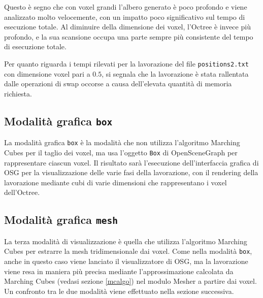 Questo è segno che con voxel grandi l'albero generato è poco profondo e viene analizzato molto velocemente, con un impatto poco significativo sul tempo di esecuzione totale. Al diminuire della dimensione dei voxel, l'Octree è invece più profondo, e la sua scansione occupa una parte sempre più consistente del tempo di esecuzione totale.

Per quanto riguarda i tempi rilevati per la lavorazione del file \texttt{positions2.txt} con dimensione voxel pari a $0.5$, si segnala che la lavorazione è stata rallentata dalle operazioni di swap occorse a causa dell'elevata quantità di memoria richiesta.

\subsection{Modalità grafica \texttt{box}}
La modalità grafica \texttt{box} è la modalità che non utilizza l'algoritmo Marching Cubes per il taglio dei voxel, ma usa l'oggetto \texttt{Box} di OpenSceneGraph per rappresentare ciascun voxel. Il risultato sarà l'esecuzione dell'interfaccia grafica di OSG per la visualizzazione delle varie fasi della lavorazione, con il rendering della lavorazione mediante cubi di varie dimensioni che rappresentano i voxel dell'Octree.

\subsection{Modalità grafica \texttt{mesh}}
La terza modalità di visualizzazione è quella che utilizza l'algoritmo Marching Cubes per estrarre la mesh tridimensionale dai voxel. Come nella modalità \texttt{box}, anche in questo caso viene lanciato il visualizzatore di OSG, ma la lavorazione viene resa in maniera più precisa mediante l'approssimazione calcolata da Marching Cubes (vedasi sezione \ref{mcalgo}) nel modulo Mesher a partire dai voxel. Un confronto tra le due modalità viene effettuato nella sezione successiva.


